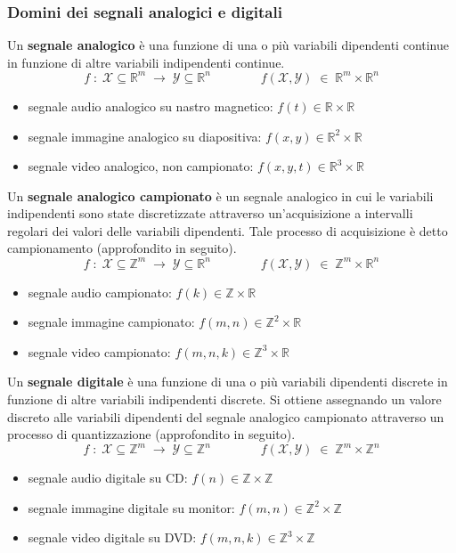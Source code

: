 \subsubsection*{Domini dei segnali analogici e digitali}
Un \textbf{segnale analogico} è una funzione di una o più variabili dipendenti continue in funzione di altre variabili
indipendenti continue.
\[f \; : \; \mathcal{X} \subseteq \mathbb{R}^m \; \to \; \mathcal{Y} \subseteq \mathbb{R}^n \qquad\qquad f(\mathcal{X}, \mathcal{Y}) \; \in \; \mathbb{R}^m \times \mathbb{R}^n\]
\begin{itemize}
	\item segnale audio analogico su nastro magnetico: \(f(t) \in \mathbb{R} \times \mathbb{R}\)
	\item segnale immagine analogico su diapositiva: \(f(x,y) \in \mathbb{R}^2 \times \mathbb{R}\)
	\item segnale video analogico, non campionato: \(f(x,y,t) \in \mathbb{R}^3 \times \mathbb{R}\)
\end{itemize}

\noindent
Un \textbf{segnale analogico campionato} è un segnale analogico in cui le variabili indipendenti sono state discretizzate
attraverso un'acquisizione a intervalli regolari dei valori delle variabili dipendenti. Tale processo di acquisizione è
detto campionamento (approfondito in seguito).
\[f \; : \; \mathcal{X} \subseteq \mathbb{Z}^m \; \to \; \mathcal{Y} \subseteq \mathbb{R}^n \qquad\qquad f(\mathcal{X}, \mathcal{Y}) \; \in \; \mathbb{Z}^m \times \mathbb{R}^n\]
\begin{itemize}
	\item segnale audio campionato: \(f(k) \in \mathbb{Z} \times \mathbb{R}\)
	\item segnale immagine campionato: \(f(m,n) \in \mathbb{Z}^2 \times \mathbb{R}\)
	\item segnale video campionato: \(f(m,n,k) \in \mathbb{Z}^3 \times \mathbb{R}\)
\end{itemize}

\noindent
Un \textbf{segnale digitale} è una funzione di una o più variabili dipendenti discrete in funzione di altre variabili
indipendenti discrete. Si ottiene assegnando un valore discreto alle variabili dipendenti del segnale analogico campionato
attraverso un processo di quantizzazione (approfondito in seguito).
\[f \; : \; \mathcal{X} \subseteq \mathbb{Z}^m \; \to \; \mathcal{Y} \subseteq \mathbb{Z}^n \qquad\qquad f(\mathcal{X}, \mathcal{Y}) \; \in \; \mathbb{Z}^m \times \mathbb{Z}^n\]
\begin{itemize}
	\item segnale audio digitale su CD: \(f(n) \in \mathbb{Z} \times \mathbb{Z}\)
	\item segnale immagine digitale su monitor: \(f(m,n) \in \mathbb{Z}^2 \times \mathbb{Z}\)
	\item segnale video digitale su DVD: \(f(m,n,k) \in \mathbb{Z}^3 \times \mathbb{Z}\)
\end{itemize}

